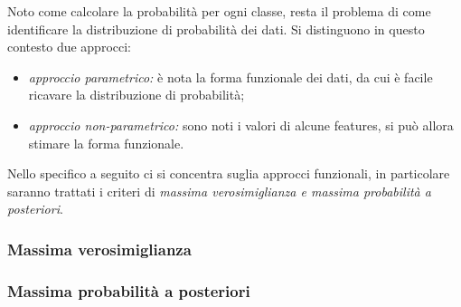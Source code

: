 \documentclass{subfiles}
\begin{document}
Noto come calcolare la probabilità per ogni classe, resta il problema di come identificare la distribuzione di probabilità dei dati.
Si distinguono in questo contesto due approcci:
\begin{itemize}
    \item \emph{approccio parametrico:} è nota la forma funzionale dei dati, da cui è facile ricavare la distribuzione di probabilità;
    \item \emph{approccio non-parametrico:} sono noti i valori di alcune features, si può allora stimare la forma funzionale.
\end{itemize}
Nello specifico a seguito ci si concentra suglia approcci funzionali,
in particolare saranno trattati i criteri di \emph{massima verosimiglianza \emph{e} massima probabilità a posteriori}.

\subsubsection{Massima verosimiglianza}


\subsubsection{Massima probabilità a posteriori}

\end{document}
